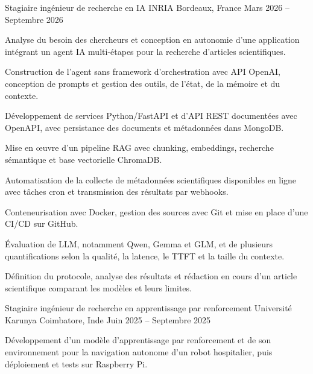 
\begin{cventries}
  \cventry
    {Stagiaire ingénieur de recherche en IA}
    {INRIA}
    {Bordeaux, France}
    {Mars 2026 -- Septembre 2026}
    {
      \begin{cvitems}
        \item {Analyse du besoin des chercheurs et conception en autonomie d’une application intégrant un agent IA multi-étapes pour la recherche d’articles scientifiques.}
        \item {Construction de l’agent sans framework d’orchestration avec API OpenAI, conception de prompts et gestion des outils, de l’état, de la mémoire et du contexte.}
        \item {Développement de services Python/FastAPI et d’API REST documentées avec OpenAPI, avec persistance des documents et métadonnées dans MongoDB.}
        \item {Mise en œuvre d’un pipeline RAG avec chunking, embeddings, recherche sémantique et base vectorielle ChromaDB.}
        \item {Automatisation de la collecte de métadonnées scientifiques disponibles en ligne avec tâches cron et transmission des résultats par webhooks.}
        \item {Conteneurisation avec Docker, gestion des sources avec Git et mise en place d’une CI/CD sur GitHub.}
        \item {Évaluation de LLM, notamment Qwen, Gemma et GLM, et de plusieurs quantifications selon la qualité, la latence, le TTFT et la taille du contexte.}
        \item {Définition du protocole, analyse des résultats et rédaction en cours d’un article scientifique comparant les modèles et leurs limites.}
      \end{cvitems}
    }

  \cventry
    {Stagiaire ingénieur de recherche en apprentissage par renforcement}
    {Université Karunya}
    {Coimbatore, Inde}
    {Juin 2025 -- Septembre 2025}
    {
      \begin{cvitems}
        \item {Développement d’un modèle d’apprentissage par renforcement et de son environnement pour la navigation autonome d’un robot hospitalier, puis déploiement et tests sur Raspberry Pi.}
      \end{cvitems}
    }
\end{cventries}
